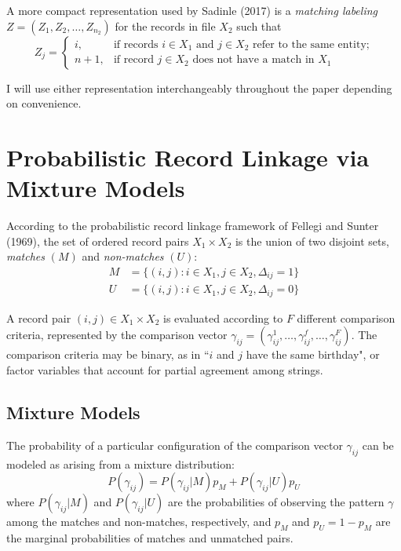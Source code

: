 \documentclass[11pt,reqno]{amsart}
\begin{document}
A more compact representation used by Sadinle (2017) is a \textit{matching labeling} $Z= (Z_1, Z_2,\dots, Z_{n_2})$ for the records in file $X_2$ such that
\[ Z_j = \begin{cases} i, & \text{if records $i\in X_1$ and $j\in X_2$ refer to the same entity;} \\
				n+1, & \text{if record $j\in X_2$ does not have a match in $X_1$} \end{cases} \]

I will use either representation interchangeably throughout the paper depending on convenience. 




\section{Probabilistic Record Linkage via Mixture Models}
According to the probabilistic record linkage framework of Fellegi and Sunter (1969), the set of ordered record pairs $X_1 \times X_2$ is the union of two disjoint sets, \textit{matches} $(M)$ and \textit{non-matches} $(U)$:
\begin{align*} M &= \{(i,j): i\in X_1, j\in X_2, \Delta_{ij}=1\} \\ U &= \{(i,j): i\in X_1, j\in X_2, \Delta_{ij}=0\}\end{align*} 

A record pair $(i,j) \in X_1\times X_2$ is evaluated according to $F$ different comparison criteria, represented by the comparison vector $\gamma_{ij}= (\gamma_{ij}^1, \dots, \gamma_{ij}^f, \dots, \gamma_{ij}^F)$.  The comparison criteria may be binary, as in ``$i$ and $j$ have the same birthday", or factor variables that account for partial agreement among strings.    


\subsection{Mixture Models} The probability of a particular configuration of the comparison vector $\gamma_{ij}$ can be modeled as arising from a mixture distribution:
\begin{equation}
P(\gamma_{ij}) = P(\gamma_{ij} | M) p_M + P(\gamma_{ij} | U) p_U 
\end{equation}
where $P(\gamma_{ij} | M)$ and $P(\gamma_{ij} | U)$ are the probabilities of observing the pattern $\gamma$ among the matches and non-matches, respectively, and $p_M$ and $p_U = 1-p_M$ are the marginal probabilities of matches and unmatched pairs. 
 
\end{document}
